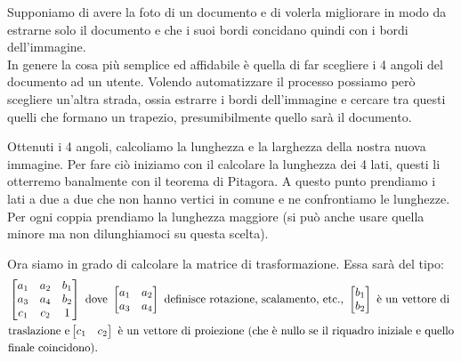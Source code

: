 \vspace{1em}

Supponiamo di avere la foto di un documento e di volerla migliorare in modo da estrarne solo il documento e che i suoi bordi concidano quindi con i bordi dell'immagine.\\

In genere la cosa più semplice ed affidabile è quella di far scegliere i 4 angoli del documento ad un utente. Volendo automatizzare il processo possiamo però scegliere un'altra strada, ossia estrarre i bordi dell'immagine e cercare tra questi quelli che formano un trapezio, presumibilmente quello sarà il documento.\\

\vspace{1em}

Ottenuti i 4 angoli, calcoliamo la lunghezza e la larghezza della nostra nuova immagine. Per fare ciò iniziamo con il calcolare la lunghezza dei 4 lati, questi li otterremo banalmente con il teorema di Pitagora. A questo punto prendiamo i lati a due a due che non hanno vertici in comune e ne confrontiamo le lunghezze.
Per ogni coppia prendiamo la lunghezza maggiore (si può anche usare quella minore ma non dilunghiamoci su questa scelta).\\

\vspace{1em}

Ora siamo in grado di calcolare la matrice di trasformazione. Essa sarà del tipo:\\
\begin{align*}
&\begin{bmatrix}
a_1&a_2&b_1\\
a_3&a_4&b_2\\
c_1&c_2&1
\end{bmatrix}
\text{ dove }
\begin{bmatrix}
a_1&a_2\\
a_3&a_4
\end{bmatrix}
\text{ definisce rotazione, scalamento, etc., } 
\begin{bmatrix}
b_1\\
b_2
\end{bmatrix}
\text{ è un vettore di}\\
&\text{traslazione e} 
\newline
\begin{bmatrix}
c_1&c_2
\end{bmatrix}
\text{ è un vettore di proiezione (che è nullo se il riquadro iniziale e quello}\\
&\text{finale coincidono).}\\
\end{align*}

